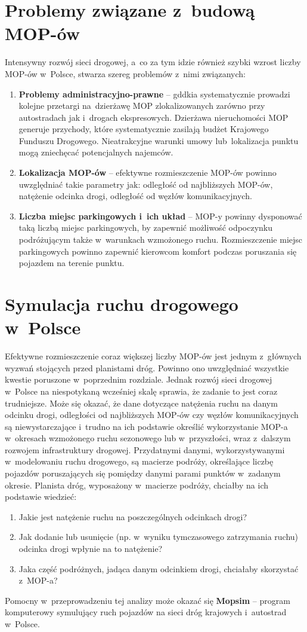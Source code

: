 \section{Problemy związane z~budową MOP-ów}
Intensywny rozwój sieci drogowej, a~co za tym idzie również szybki wzrost liczby MOP-ów w~Polsce, stwarza szereg problemów z~nimi związanych:
\begin{enumerate}
    \item \textbf{Problemy administracyjno-prawne} -- \acrshort{gddkia} systematycznie prowadzi kolejne przetargi na~dzierżawę MOP zlokalizowanych zarówno przy autostradach jak i~drogach ekspresowych. Dzierżawa nieruchomości MOP generuje przychody, które systematycznie zasilają budżet Krajowego Funduszu Drogowego. Nieatrakcyjne warunki umowy lub~lokalizacja punktu mogą zniechęcać potencjalnych najemców.
    \item \textbf{Lokalizacja MOP-ów} -- efektywne rozmieszczenie MOP-ów powinno uwzględniać takie parametry jak: odległość od najbliższych MOP-ów, natężenie odcinka drogi, odległość od węzłów komunikacyjnych.
    \item \textbf{Liczba miejsc parkingowych i~ich układ} -- MOP-y powinny dysponować taką liczbą miejsc parkingowych, by zapewnić możliwość odpoczynku podróżującym także w~warunkach wzmożonego ruchu. Rozmieszczenie miejsc parkingowych powinno zapewnić kierowcom komfort podczas poruszania się pojazdem na terenie punktu.
\end{enumerate}

\section{Symulacja ruchu drogowego w~Polsce}
Efektywne rozmieszczenie coraz większej liczby MOP-ów jest jednym z~głównych wyzwań stojących przed planistami dróg. Powinno ono uwzględniać wszystkie kwestie poruszone w~poprzednim rozdziale. Jednak rozwój sieci drogowej w~Polsce na niespotykaną wcześniej skalę sprawia, że zadanie to jest coraz trudniejsze. Może się okazać, że dane dotyczące natężenia ruchu na danym odcinku drogi, odległości od najbliższych MOP-ów czy węzłów komunikacyjnych są niewystarczające i~trudno na ich podstawie określić wykorzystanie MOP-a w~okresach wzmożonego ruchu sezonowego lub w~przyszłości, wraz z~dalszym rozwojem infrastruktury drogowej. Przydatnymi danymi, wykorzystywanymi w~modelowaniu ruchu drogowego, są macierze podróży, określające liczbę pojazdów poruszających się pomiędzy danymi parami punktów w~zadanym okresie. Planista dróg, wyposażony w~macierze podróży, chciałby na ich podstawie wiedzieć:
\begin{enumerate}
	\item Jakie jest natężenie ruchu na poszczególnych odcinkach drogi?
	\item Jak dodanie lub usunięcie (np. w~wyniku tymczasowego zatrzymania ruchu) odcinka drogi wpłynie na to natężenie?
	\item Jaka część podróżnych, jadąca danym odcinkiem drogi, chciałaby skorzystać z~MOP-a?
\end{enumerate}
Pomocny w~przeprowadzeniu tej analizy może okazać się \textbf{Mopsim} -- program komputerowy symulujący ruch pojazdów na
sieci dróg krajowych i~autostrad w~Polsce.

